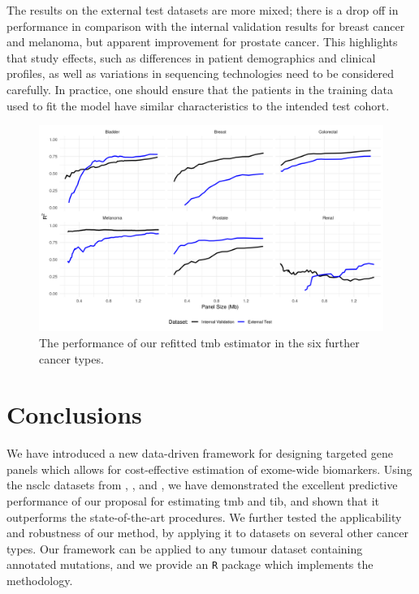 \documentclass[../thesis.tex]{subfiles}
\begin{document}
{The results on the external test datasets are more mixed; there is a drop off in performance in comparison with the internal validation results for breast cancer and melanoma, but apparent improvement for prostate cancer. This highlights that study effects, such as differences in patient demographics and clinical profiles, as well as variations in sequencing technologies need to be considered carefully. In practice, one should ensure that the patients in the training data used to fit the model have similar characteristics to the intended test cohort.}

\begin{figure}[h]
    \centering
    \includegraphics[width=6.5in]{../figures/chapter3/external_validation_fig.png} 
    \caption{The performance of our refitted \gls{tmb} estimator in the six further cancer types.    
    \label{fig:external_validation_fig}}
\end{figure}



\section{Conclusions \label{sec:conclusion}}
 We have introduced a new data-driven framework for designing targeted gene panels which allows for cost-effective estimation of exome-wide biomarkers.  Using the \acrlong{nsclc} datasets from \citet{campbell_distinct_2016}{,  \citet{hellmann_genomic_2018}, and \citet{rizvi_mutational_2015}}, we have demonstrated the excellent predictive performance of our proposal for estimating \acrlong{tmb} and \acrlong{tib}, and shown that it outperforms the state-of-the-art procedures. {We further tested the applicability and robustness of our method, by applying it to datasets on several other cancer types.}  Our framework can be applied to any tumour dataset containing annotated mutations, and we provide an \texttt{R} package \citep{bradley_icbiomark_2021} which implements the methodology.
 
\end{document}
